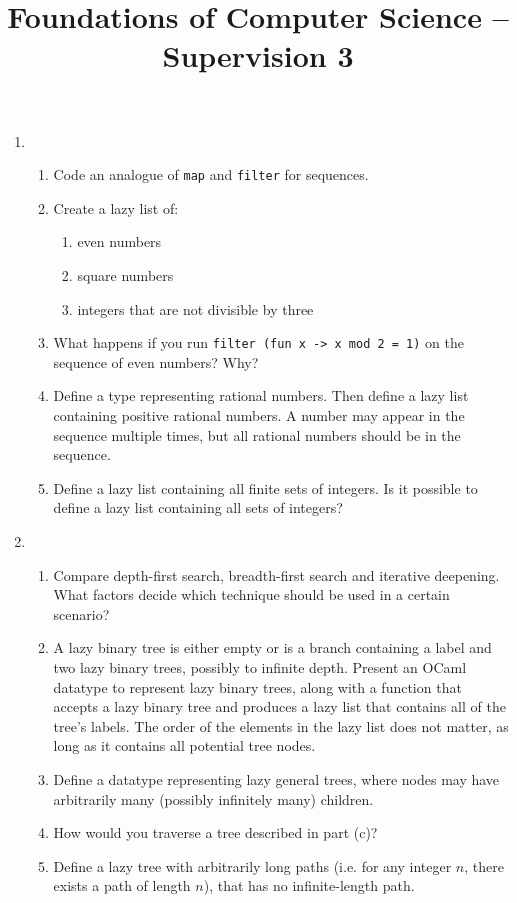 \documentclass[11pt,a4paper]{article}
\title{Foundations of Computer Science -- Supervision 3}
\author{}
\date{}
\begin{document}
\maketitle

\begin{enumerate}

\item
\begin{enumerate}
    \item Code an analogue of \verb|map| and \verb|filter| for sequences.

    \item Create a lazy list of:
    \begin{enumerate}
        \item even numbers
        \item square numbers
        \item integers that are not divisible by three
    \end{enumerate}

    \item What happens if you run \verb|filter (fun x -> x mod 2 = 1)| on the sequence of even numbers? Why?

    \item Define a type representing rational numbers.  
    Then define a lazy list containing positive rational numbers.  
    A number may appear in the sequence multiple times, but all rational numbers should be in the sequence.

    \item Define a lazy list containing all finite sets of integers.  
    Is it possible to define a lazy list containing all sets of integers?
\end{enumerate}

\item
\begin{enumerate}
    \item Compare depth-first search, breadth-first search and iterative deepening.
    What factors decide which technique should be used in a certain scenario?

    \item A lazy binary tree is either empty or is a branch containing a label and two lazy binary trees, possibly to infinite depth.  
    Present an OCaml datatype to represent lazy binary trees, along with a function that accepts a lazy binary tree and produces a lazy list that contains all of the tree’s labels.  
    The order of the elements in the lazy list does not matter, as long as it contains all potential tree nodes.

    \item Define a datatype representing lazy general trees, where nodes may have arbitrarily many (possibly infinitely many) children.

    \item How would you traverse a tree described in part (c)?

    \item Define a lazy tree with arbitrarily long paths (i.e. for any integer $n$, there exists a path of length $n$), that has no infinite-length path.
\end{enumerate}

\end{enumerate}
\end{document}

